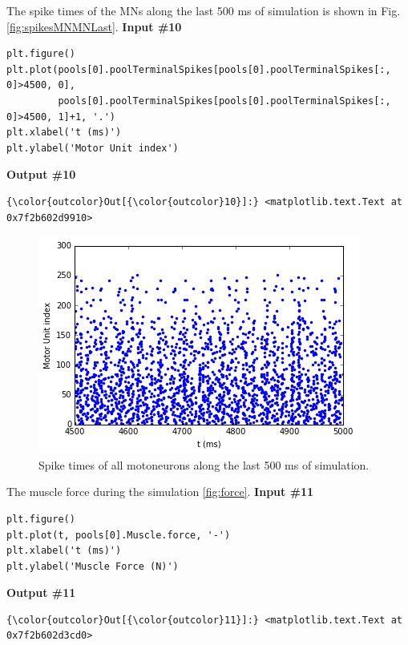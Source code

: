 \documentclass{article}
\makeatletter
\def\maxwidth{\ifdim\Gin@nat@width>\linewidth\linewidth
    \else\Gin@nat@width\fi}
\let\Oldincludegraphics\includegraphics
\renewcommand{\includegraphics}[1]{\Oldincludegraphics[width=.8\maxwidth]{#1}}
\makeatother
\begin{document}
    The spike times of the MNs along the last 500 ms of simulation is shown
in Fig. \ref{fig:spikesMNMNLast}.
\newline\textbf{Input \#{}10}\begin{verbatim}
plt.figure()
plt.plot(pools[0].poolTerminalSpikes[pools[0].poolTerminalSpikes[:, 0]>4500, 0],
         pools[0].poolTerminalSpikes[pools[0].poolTerminalSpikes[:, 0]>4500, 1]+1, '.')
plt.xlabel('t (ms)')
plt.ylabel('Motor Unit index')
\end{verbatim}\textbf{Output \#{}10}
            \begin{Verbatim}[commandchars=\\\{\}]
{\color{outcolor}Out[{\color{outcolor}10}]:} <matplotlib.text.Text at 0x7f2b602d9910>
\end{Verbatim}
        
    \begin{figure}
        \begin{center}
        \includegraphics{MNPoolWithDescendingCommand_files/MNPoolWithDescendingCommand_14_1.png}
        \end{center}
        \caption{Spike times of all motoneurons along the last 500 ms of simulation.}
        \label{fig:spikesMNMN}
    \end{figure}
    
    The muscle force during the simulation \ref{fig:force}.
\newline\textbf{Input \#{}11}\begin{verbatim}
plt.figure()
plt.plot(t, pools[0].Muscle.force, '-')
plt.xlabel('t (ms)')
plt.ylabel('Muscle Force (N)')
\end{verbatim}\textbf{Output \#{}11}
            \begin{Verbatim}[commandchars=\\\{\}]
{\color{outcolor}Out[{\color{outcolor}11}]:} <matplotlib.text.Text at 0x7f2b602d3cd0>
\end{Verbatim}
        
\end{document}
